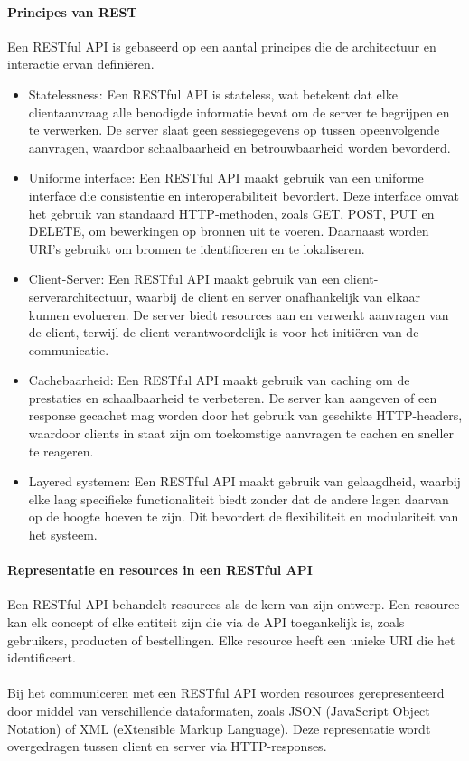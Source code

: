 \paragraph{Principes van REST}
Een RESTful API is gebaseerd op een aantal principes die de architectuur en interactie ervan definiëren.

\begin{itemize}
    \item Statelessness: Een RESTful API is stateless, wat betekent dat elke clientaanvraag alle benodigde informatie bevat om de server te begrijpen en te verwerken. De server slaat geen sessiegegevens op tussen opeenvolgende aanvragen, waardoor schaalbaarheid en betrouwbaarheid worden bevorderd.
    \item Uniforme interface: Een RESTful API maakt gebruik van een uniforme interface die consistentie en interoperabiliteit bevordert. Deze interface omvat het gebruik van standaard HTTP-methoden, zoals GET, POST, PUT en DELETE, om bewerkingen op bronnen uit te voeren. Daarnaast worden URI's gebruikt om bronnen te identificeren en te lokaliseren.
    \item Client-Server: Een RESTful API maakt gebruik van een client-serverarchitectuur, waarbij de client en server onafhankelijk van elkaar kunnen evolueren. De server biedt resources aan en verwerkt aanvragen van de client, terwijl de client verantwoordelijk is voor het initiëren van de communicatie.
    \item Cachebaarheid: Een RESTful API maakt gebruik van caching om de prestaties en schaalbaarheid te verbeteren. De server kan aangeven of een response gecachet mag worden door het gebruik van geschikte HTTP-headers, waardoor clients in staat zijn om toekomstige aanvragen te cachen en sneller te reageren.
    \item Layered systemen: Een RESTful API maakt gebruik van gelaagdheid, waarbij elke laag specifieke functionaliteit biedt zonder dat de andere lagen daarvan op de hoogte hoeven te zijn. Dit bevordert de flexibiliteit en modulariteit van het systeem.
\end{itemize} \autocite{Gillis2020}

\paragraph{Representatie en resources in een RESTful API}
Een RESTful API behandelt resources als de kern van zijn ontwerp. Een resource kan elk concept of elke entiteit zijn die via de API toegankelijk is, zoals gebruikers, producten of bestellingen. Elke resource heeft een unieke URI die het identificeert.
\\ \\
Bij het communiceren met een RESTful API worden resources gerepresenteerd door middel van verschillende dataformaten, zoals JSON (JavaScript Object Notation) of XML (eXtensible Markup Language). Deze representatie wordt overgedragen tussen client en server via HTTP-responses. \autocite{Gillis2020}

